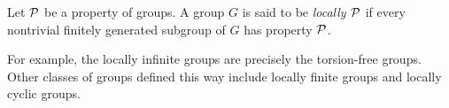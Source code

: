 \documentclass[12pt]{article}
\begin{document}

Let $\cal P$ be a property of groups.
A group $G$ is said to be \emph{locally $\cal P$} if every nontrivial finitely generated subgroup of $G$ has property $\cal P$.

For example, the locally infinite groups are precisely the torsion-free groups.
Other classes of groups defined this way include locally finite groups and locally cyclic groups.
\end{document}
